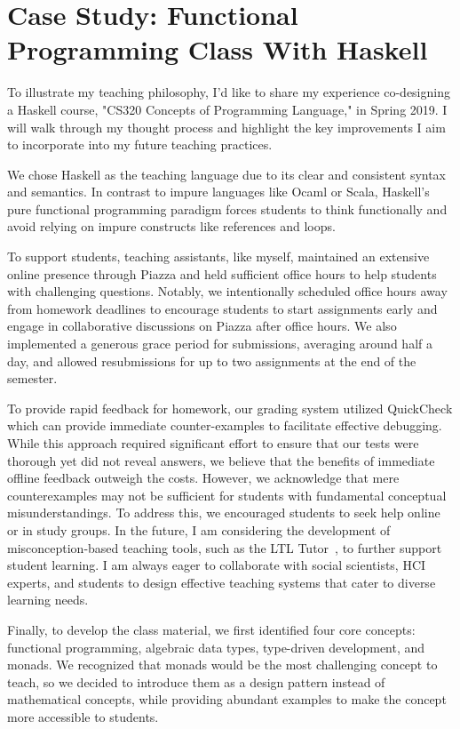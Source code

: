 \documentclass[11pt,a4paper,sans]{moderncv} %
\begin{document}
\section{Case Study: Functional Programming Class With Haskell}

To illustrate my teaching philosophy, I'd like to share my experience co-designing a Haskell course, "CS320 Concepts of Programming Language," in Spring 2019.
I will walk through my thought process and highlight the key improvements I aim to incorporate into my future teaching practices.

We chose Haskell as the teaching language due to its clear and consistent syntax and semantics. 
In contrast to impure languages like Ocaml or Scala, Haskell's pure functional programming paradigm forces students to think functionally and avoid relying on impure constructs like references and loops.

To support students, teaching assistants, like myself, maintained an extensive online presence through Piazza and held sufficient office hours to help students with challenging questions. 
Notably, we intentionally scheduled office hours away from homework deadlines to encourage students to start assignments early and engage in collaborative discussions on Piazza after office hours.
We also implemented a generous grace period for submissions, averaging around half a day, and allowed resubmissions for up to two assignments at the end of the semester. 

To provide rapid feedback for homework, our grading system utilized QuickCheck which can provide immediate counter-examples to facilitate effective debugging. 
While this approach required significant effort to ensure that our tests were thorough yet did not reveal answers, we believe that the benefits of immediate offline feedback outweigh the costs. 
However, we acknowledge that mere counterexamples may not be sufficient for students with fundamental conceptual misunderstandings. 
To address this, we encouraged students to seek help online or in study groups. 
In the future, I am considering the development of misconception-based teaching tools, such as the LTL Tutor~\cite{plt_LTLTutor_2024}, to further support student learning. 
I am always eager to collaborate with social scientists, HCI experts, and students to design effective teaching systems that cater to diverse learning needs.

Finally, to develop the class material, we first identified four core concepts: functional programming, algebraic data types, type-driven development, and monads. 
We recognized that monads would be the most challenging concept to teach, so we decided to introduce them as a design pattern instead of mathematical concepts, while providing abundant examples to make the concept more accessible to students.
\end{document}
